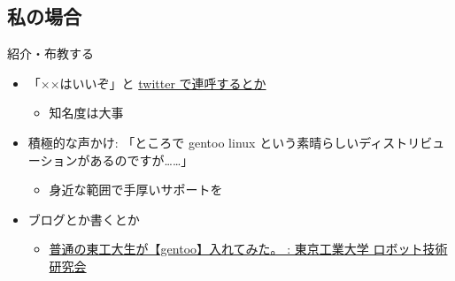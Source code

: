 \documentclass[
        unicode%
    ]{beamer}
\begin{document}
\subsection{私の場合}

\begin{frame}{紹介・布教する}
    \begin{itemize}
        \pause
        \item 「××はいいぞ」と \href{http://twilog.org/lo48576/search?word=Rust\%20\%E3\%81\%AF\%E3\%81\%84\%E3\%81\%84\%E3\%81\%9E&ao=a}{twitter で連呼するとか}
            \begin{itemize}
                \item 知名度は大事
            \end{itemize}
        \pause
        \item 積極的な声かけ: 「ところで gentoo linux という素晴らしいディストリビューションがあるのですが……」
            \begin{itemize}
                \item 身近な範囲で手厚いサポートを
            \end{itemize}
        \pause
        \item ブログとか書くとか
            \begin{itemize}
                \item \href{http://titech-ssr.blog.jp/archives/1013311908.html}{普通の東工大生が【gentoo】入れてみた。 : 東京工業大学 ロボット技術研究会}
            \end{itemize}
    \end{itemize}
\end{frame}
\end{document}
